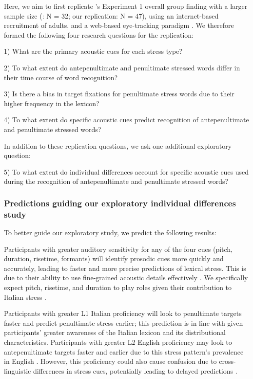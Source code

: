 Here, we aim to first replicate \cite{Sulpizio_McQueen_2012}'s Experiment 1 overall group finding with a larger sample size (\cite{Sulpizio_McQueen_2012}: N = 32; our replication: N = 47), using an internet-based recruitment of adults, and a web-based eye-tracking paradigm \citep{Vos_2017}. We therefore formed the following four research questions for the replication:

1) What are the primary acoustic cues for each stress type? 

2) To what extent do antepenultimate and penultimate stressed words differ in their time course of word recognition? 

3) Is there a bias in target fixations for penultimate stress words due to their higher frequency in the lexicon? 

4) To what extent do specific acoustic cues predict recognition of antepenultimate and penultimate stressed words? 

In addition to these replication questions, we ask one additional exploratory question: 

5) To what extent do individual differences account for specific acoustic cues used during the recognition of antepenultimate and penultimate stressed words?

\subsubsection{Predictions guiding our exploratory individual differences study}
To better guide our exploratory study, we predict the following results: 

Participants with greater auditory sensitivity for any of the four cues (pitch, duration, risetime, formants) will identify prosodic cues more quickly and accurately, leading to faster and more precise predictions of lexical stress. This is due to their ability to use fine-grained acoustic details effectively \citep{nan_2010, goss_2014,mcmurray_2008}. We specifically expect pitch, risetime, and duration to play roles given their contribution to Italian stress \citep{Tagliapietra2005, Alfano2006,Alfano2009,Maturi1998}.

Participants with greater L1 Italian proficiency will look to penultimate targets faster and predict penultimate stress earlier; this prediction is in line with \cite{Sulpizio_McQueen_2012} given participants' greater awareness of the Italian lexicon and its distributional characteristics. Participants with greater L2 English proficiency may look to antepenultimate targets faster and earlier due to this stress pattern's prevalence in English \citep{cutler2007dutch}. However, this proficiency could also cause confusion due to cross-linguistic differences in stress cues, potentially leading to delayed predictions \citep{primativo2013bilingual}. 

